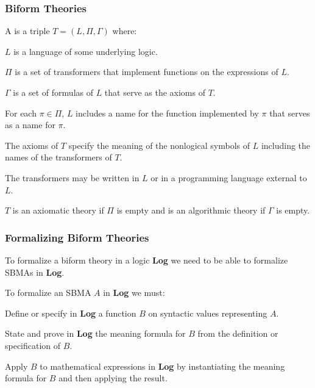 \documentclass[t,12pt,numbers,fleqn]{beamer}
\begin{document}
\begin{frame}
\frametitle{Biform Theories}
\bi

  \item A  is a triple $T=(L,\Pi,\Gamma)$ where:

  \be

    \item $L$ is a language of some underlying logic.

    \item $\Pi$ is a set of transformers that implement functions on
      the expressions of $L$.

    \item $\Gamma$ is a set of formulas of $L$ that serve as the axioms of $T$.

  \ee

  \item For each $\pi \in \Pi$, $L$ includes a name for the function
    implemented by $\pi$ that serves as a name for $\pi$.

  \item The axioms of $T$ specify the meaning of the nonlogical
    symbols of $L$ including the names of the transformers of $T$.

  \item The transformers may be written in $L$ or in a programming
    language external to $L$.

  \item $T$ is an axiomatic theory if $\Pi$ is empty and is an
    algorithmic theory if $\Gamma$ is empty.

\ei
\end{frame}


\begin{frame}
\frametitle{Formalizing Biform Theories}
\bi

  \item To formalize a biform theory in a logic \textbf{Log} we need
    to be able to formalize SBMAs in \textbf{Log}.

\pause

  \item To formalize an SBMA $A$ in \textbf{Log} we must:

  \be

    \item Define or specify in \textbf{Log} a function $B$ on
      syntactic values representing $A$.

    \item State and prove in \textbf{Log} the meaning formula for
      $B$ from the definition or specification of $B$.

    \item Apply $B$ to mathematical expressions in \textbf{Log} by
      instantiating the meaning formula for $B$ and then applying the
      result.

  \ee

\ei
\end{frame}
\end{document}
